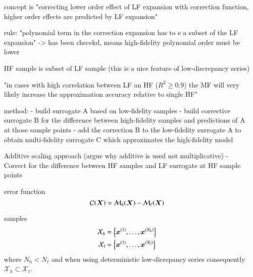 concept is "correcting lower order effect of LF expansion with correction function, higher order effects are predicted by LF expansion" \cite{palar_multi-fidelity_2016}

rule: "polynomial term in the correction expansion has to e a subset of the LF expansion" \cite{palar_multi-fidelity_2016}
-> has been checekd, means high-fidelity polynomial order must be lower 

HF sample is subset of LF sample (this is a nice feature of low-discrepancy series)

"in cases with high correlation between LF an HF ($R^2 \geq 0.9$) the MF will very likely increase the approximation accuracy relative to single HF" \cite{palar_multi-fidelity_2016}

method:
- build surrogate A based on low-fidelity samples
- build corrective surrogate B for the difference between high-fidelity samples and predictions of A at those sample points
- add the correction B to the low-fidelity surrogate A to obtain multi-fidelity surrogate C which approximates the high-fidelity model

Additive scaling approach (argue why additive is used not multiplicative)
- Correct for the difference between HF samples and LF surrogate at HF sample points

error function
\begin{equation}
    \mathcal{C}(\bm X) = \mathcal{M}_h(\bm X) - \mathcal{M}_\ell(\bm X)
\end{equation}

samples
\begin{align}
    \mathcal{X}_h &= \left\{ \bm{x}^{(1)}, \dots, \bm{x}^{(N_h)}\right\} \\
    \mathcal{X}_l &= \left\{ \bm{x}^{(1)}, \dots, \bm{x}^{(N_l)}\right\}
\end{align}
where $N_h < N_\ell$ and when using deterministic low-dicrepancy series
consequently $\mathcal{X}_h \subset \mathcal{X}_\ell$.

